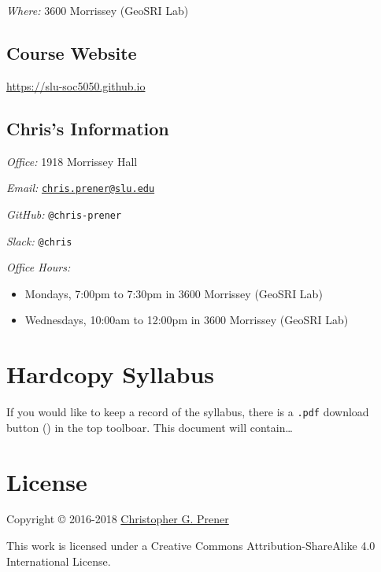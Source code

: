 \documentclass[]{book}
\theoremstyle{definition}
\theoremstyle{definition}
\theoremstyle{definition}
\theoremstyle{remark}
\begin{document}
\emph{Where:} 3600 Morrissey (GeoSRI Lab)

\hypertarget{course-website}{%
\subsection*{Course Website}\label{course-website}}

\url{https://slu-soc5050.github.io}

\hypertarget{chriss-information}{%
\subsection*{Chris's Information}\label{chriss-information}}

\emph{Office:} 1918 Morrissey Hall

\emph{Email:}
\href{mailto:chris.prener@slu.edu}{\nolinkurl{chris.prener@slu.edu}}

\emph{GitHub:} \texttt{@chris-prener}

\emph{Slack:} \texttt{@chris}

\emph{Office Hours:}

\begin{itemize}
\item
  Mondays, 7:00pm to 7:30pm in 3600 Morrissey (GeoSRI Lab)
\item
  Wednesdays, 10:00am to 12:00pm in 3600 Morrissey (GeoSRI Lab)
\end{itemize}

\hypertarget{hardcopy-syllabus}{%
\section*{Hardcopy Syllabus}\label{hardcopy-syllabus}}

If you would like to keep a record of the syllabus, there is a
\texttt{.pdf} download button () in the top toolboar. This document will
contain\ldots{}

\hypertarget{license}{%
\section*{License}\label{license}}

Copyright © 2016-2018 \href{https://chris-prener.github.io}{Christopher
G. Prener}

This work is licensed under a Creative Commons Attribution-ShareAlike
4.0 International License.
\end{document}
